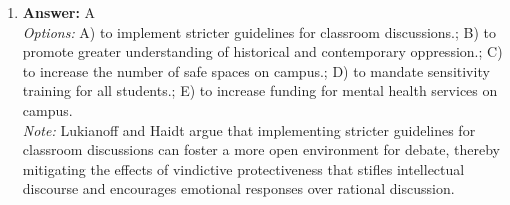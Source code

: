 \documentclass[12pt]{article}
\begin{document}
\begin{enumerate}[label=\arabic*.]
\\ \textit{Note:} Socrates objects to Euthyphro's definition of the holy as prosecuting wrongdoers because it is too narrow and overlooks the existence of other actions and qualities that can also be considered holy, thereby failing to capture the essence of what is truly holy.
\item \textbf{Answer:} A
\\ \textit{Options:} A) to implement stricter guidelines for classroom discussions.; B) to promote greater understanding of historical and contemporary oppression.; C) to increase the number of safe spaces on campus.; D) to mandate sensitivity training for all students.; E) to increase funding for mental health services on campus.
\\ \textit{Note:} Lukianoff and Haidt argue that implementing stricter guidelines for classroom discussions can foster a more open environment for debate, thereby mitigating the effects of vindictive protectiveness that stifles intellectual discourse and encourages emotional responses over rational discussion.
\end{enumerate}
\end{document}
